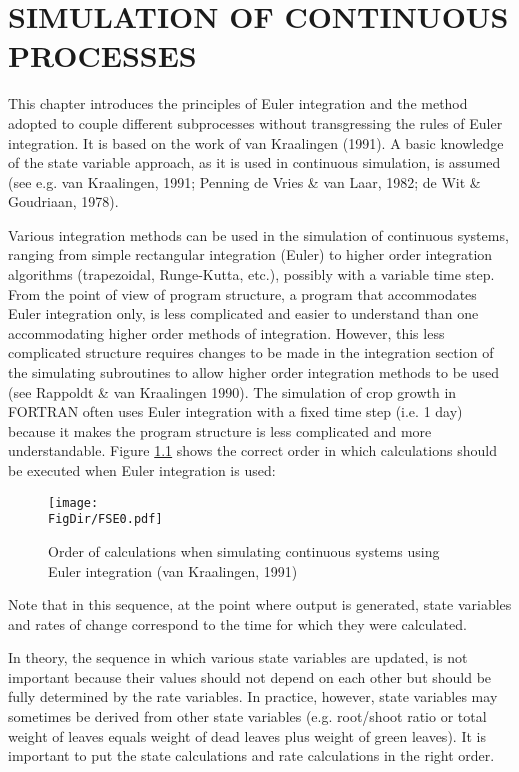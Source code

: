 \chapter{SIMULATION OF CONTINUOUS PROCESSES}

This chapter introduces the principles of Euler integration and the method adopted to
couple different subprocesses without transgressing the rules of Euler integration. It is
based on the work of van Kraalingen (1991). A basic knowledge of the state variable
approach, as it is used in continuous simula\-tion, is assumed (see e.g. van Kraalingen,
1991; Penning de Vries \& van Laar, 1982; de Wit \& Goudriaan, 1978).

Various integration methods can be used in the simulation of continuous systems, ranging
from simple rectangular integration (Euler) to higher order integration algorithms 
(trap\-ezoidal, Runge-Kutta, etc.), possibly with a variable time step. From the point of 
view of program structure, a program that accommodates Euler integra\-tion only, is less 
compli\-cated and easier to understand than one accommodating higher order methods of 
integra\-tion. However, this less complicated structure requires changes to be made in the
integration section of the simulating subroutines to allow higher order integration methods
to be used (see Rappoldt \& van Kraalin\-gen 1990). The simulation of crop growth in
FORTRAN often uses Euler integration with a fixed time step (i.e. 1 day) because it
makes the program structure is less complicated and more understandable. Figure \ref{fig:euler}
shows the correct order in which calculations should be executed when Euler integration
is used:

\begin{figure}[p]
\centering
\texttt{[image: \\FigDir/FSE0.pdf]}
\caption{Order of calcu\-lations when simulat\-ing con\-tinuous systems using Euler 
         inte\-gra\-tion (van Kraalingen, 1991)}
\label{fig:euler}
\end{figure}

Note that in this sequence, at the point where output is generated, state variables and rates
of change correspond to the time for which they were calculated. 

In theory, the sequence in which various state variables are updated, is not important
because their values should not depend on each other but should be fully determined by
the rate variables. In practice, however, state variables may sometimes be derived from
other state variables (e.g. root/shoot ratio or total weight of leaves equals weight of dead
leaves plus weight of green leaves). It is important to put the state calcula\-tions and rate
calculations in the right order.

